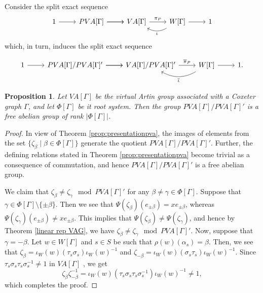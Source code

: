 \documentclass[12pt]{amsart}
\newtheorem{proposition}[equation]{Proposition}
\numberwithin{equation}{section}
\begin{document}
Consider the split  exact sequence
\begin{equation*}
\begin{tikzcd}
1 \arrow[r] & PVA[\Gamma] \arrow[r] \arrow[r] & VA[\Gamma] \arrow[r, , "\pi_P"] & {W[\Gamma]} \arrow[r] \arrow[l,  "\iota", bend left] & 1
\end{tikzcd}
\end{equation*}
which, in turn, induces the split  exact sequence

\begin{equation}\label{splitting for crystallographic}
\begin{tikzcd}
1 \arrow[r] & {PVA[\Gamma]/PVA[\Gamma]'} \arrow[r] \arrow[r] & {VA[\Gamma]/PVA[\Gamma]'} \arrow[r, , "\overline{\pi}_P"] & {W[\Gamma]} \arrow[r] \arrow[l,  "\overline{\iota}", bend left] & 1.
\end{tikzcd}
\end{equation}

\begin{proposition}\label{prop:freeabelian}
Let $VA[\Gamma]$ be the virtual Artin group associated with a Coxeter graph $\Gamma$, and let $\Phi[\Gamma]$ be it root system. Then the group $PVA[\Gamma]/PVA[\Gamma]'$ is a free abelian group of rank $|\Phi[\Gamma]|$.
\end{proposition}

\begin{proof}
In view of Theorem \ref{prop:presentationpva}, the images of elements from the set $\{\zeta_\beta  \mid \beta\in\Phi[\Gamma]\}$ generate the quotient $PVA[\Gamma]/PVA[\Gamma]'$. Further, the defining relations stated in Theorem \ref{prop:presentationpva} become trivial as a consequence of commutation, and hence $PVA[\Gamma]/PVA[\Gamma]'$ is a free abelian group. 
\par
We claim that $\zeta_\beta\ne \zeta_\gamma \mod PVA[\Gamma]'$ for any $\beta \neq \gamma \in \Phi[\Gamma]$. Suppose that $\gamma \in \Phi[\Gamma]\setminus \{\pm \beta\}$. Then we see that  $\Psi(\zeta_{\beta})(e_{\pm \beta})=xe_{\pm \beta}$, whereas $\Psi(\zeta_{\gamma})(e_{\pm \beta}) \ne xe_{\pm \beta}$. This implies that  $\Psi(\zeta_{\beta}) \neq  \Psi(\zeta_{\gamma})$, and hence by Theorem \ref{linear rep VAG}, we have $\zeta_\beta\ne \zeta_\gamma \mod PVA[\Gamma]'$. Now, suppose that $\gamma=-\beta$. Let $w\in W[\Gamma]$ and $s \in S$ be such that $\rho(w)(\alpha_s)=\beta$. Then, we see that $\zeta_{\beta}= \iota_W(w)(\tau_s\sigma_s)\iota_W(w)^{-1}$ and $\zeta_{-\beta}= \iota_W(w)(\sigma_s\tau_s)\iota_W(w)^{-1}$. Since  $\tau_s\sigma_s\tau_s\sigma_s^{-1}\neq 1$ in $VA[\Gamma]$ \cite[Proof of Corollary 3.4]{MR4753773}, we get
$$
\zeta_{\beta}\zeta_{-\beta}^{-1}= \iota_W(w)(\tau_s\sigma_s\tau_s \sigma_s^{-1})\iota_W(w)^{-1} \neq 1,
$$
which completes the proof.
\end{proof}
\end{document}
